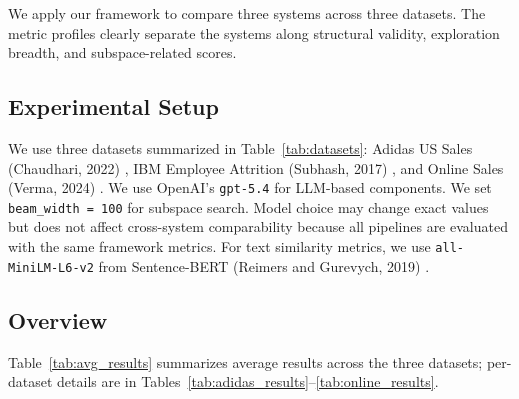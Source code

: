 \documentclass[conference]{IEEEtran}
\begin{document}
We apply our framework to compare three systems across three datasets. The metric profiles clearly separate the systems along structural validity, exploration breadth, and subspace-related scores.

\subsection{Experimental Setup}

We use three datasets summarized in Table~\ref{tab:datasets}: Adidas US Sales (Chaudhari, 2022) \cite{adidas}, IBM Employee Attrition (Subhash, 2017) \cite{ibm}, and Online Sales (Verma, 2024) \cite{online}. We use OpenAI's \texttt{gpt-5.4} for LLM-based components. We set \texttt{beam\_width = 100} for subspace search. Model choice may change exact values but does not affect cross-system comparability because all pipelines are evaluated with the same framework metrics. For text similarity metrics, we use \texttt{all-MiniLM-L6-v2} from Sentence-BERT (Reimers and Gurevych, 2019) \cite{sbert}.

\subsection{Overview}

{
\renewcommand{\arraystretch}{0.9}
\setlength{\belowcaptionskip}{-2pt}
\begin{table}[htbp]
\caption{Dataset Characteristics}
\begin{center}
\label{tab:datasets}
\end{center}
\end{table}
}

Table~\ref{tab:avg_results} summarizes average results across the three datasets; per-dataset details are in Tables~\ref{tab:adidas_results}--\ref{tab:online_results}.
\end{document}
